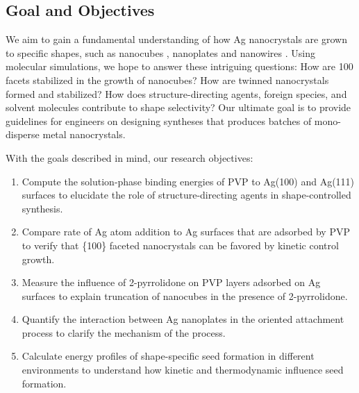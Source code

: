 \subsection{Goal and Objectives}

We aim to gain a fundamental understanding of how Ag nanocrystals are grown to specific shapes, such as nanocubes \cite{Im_2005}, nanoplates \cite{Lofton_2005} and nanowires \cite{Tsuji_2008}.
Using molecular simulations, we hope to answer these intriguing questions:
How are {100} facets stabilized in the growth of nanocubes?
How are twinned nanocrystals formed and stabilized?
How does structure-directing agents, foreign species, and solvent molecules contribute to shape selectivity?
Our ultimate goal is to provide guidelines for engineers on designing syntheses that produces batches of mono-disperse metal nanocrystals.

With the goals described in mind, our research objectives:
\begin{enumerate}
\item Compute the solution-phase binding energies of PVP to Ag(100) and Ag(111) surfaces to elucidate the role of structure-directing agents in shape-controlled synthesis.
\item Compare rate of Ag atom addition to Ag surfaces that are adsorbed by PVP to verify that \{100\} faceted nanocrystals can be favored by kinetic control growth.
\item Measure the influence of 2-pyrrolidone on PVP layers adsorbed on Ag surfaces to explain truncation of nanocubes in the presence of 2-pyrrolidone.
\item Quantify the interaction between Ag nanoplates in the oriented attachment process to clarify the mechanism of the process.
\item Calculate energy profiles of shape-specific seed formation in different environments to understand how kinetic and thermodynamic influence seed formation.
\end{enumerate}
    
    
    
    
    
    
    
    
    
